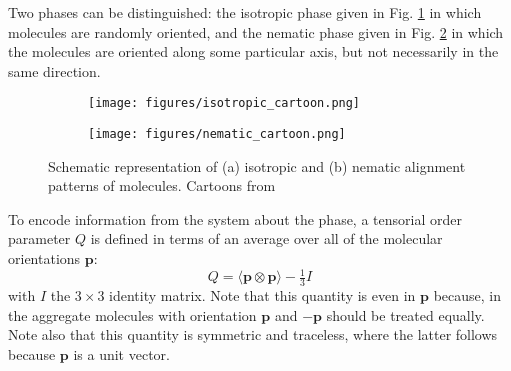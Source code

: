 \documentclass[reqno]{article}
\begin{document}
  Two phases can be distinguished: the isotropic phase given in
  Fig. \ref{fig:isotropic-cartoon} in which molecules are randomly oriented, and
  the nematic phase given in Fig. \ref{fig:nematic-cartoon} in which the
  molecules are oriented along some particular axis, but not necessarily in the
  same direction.
  \begin{figure}[h] 
    \centering
    \begin{subfigure}{0.4\textwidth}
      \texttt{[image: figures/isotropic\_cartoon.png]}
      \caption{}
      \label{fig:isotropic-cartoon}
    \end{subfigure}
    \hfill
    \begin{subfigure}{0.4\textwidth}
      \texttt{[image: figures/nematic\_cartoon.png]}
      \caption{}
      \label{fig:nematic-cartoon}
    \end{subfigure}
    \caption{Schematic representation of (a) isotropic and (b) nematic alignment
      patterns of molecules. Cartoons from ~\cite{selinger_introduction_2016}}
    \label{fig:alignment-cartoons}
  \end{figure}
  To encode information from the system about the phase, a tensorial
  order parameter $Q$ is defined in terms of an average over all of the molecular
  orientations $\mathbf{p}$:
  \begin{equation} \label{eq:Q-def}
    Q = \langle \mathbf{p} \otimes \mathbf{p} \rangle - \tfrac13 I
  \end{equation}
  with $I$ the $3\times 3$ identity matrix.
  Note that this quantity is even in $\mathbf{p}$ because, in the aggregate
  molecules with orientation $\mathbf{p}$ and $-\mathbf{p}$ should be treated
  equally.
  Note also that this quantity is symmetric and traceless, where the latter
  follows because $\mathbf{p}$ is a unit vector.
\end{document}
